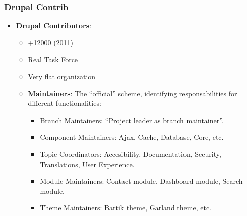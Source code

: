 \begin{frame}[allowframebreaks]
\frametitle{Drupal Contrib}

\begin{itemize}
\item \textbf{Drupal Contributors}: 
\begin{itemize}
\item {+12000 (2011)}
\item {Real Task Force}
\item {Very flat organization}
\item {\textbf{Maintainers}}: The ``official'' scheme, identifying responsabilities for different functionalities:
\begin{itemize}
\item {Branch Maintainers}: ``Project leader as branch maintainer''.
\item {Component Maintainers}: Ajax, Cache, Database, Core, etc.
\item {Topic Coordinators}: Accesibility, Documentation, Security, Translations, User Experience.
\item {Module Maintainers}: Contact module, Dashboard module, Search module.
\item {Theme Maintainers}: Bartik theme, Garland theme, etc.
\end{itemize}
\end{itemize}
\end{itemize}

\end{frame}
